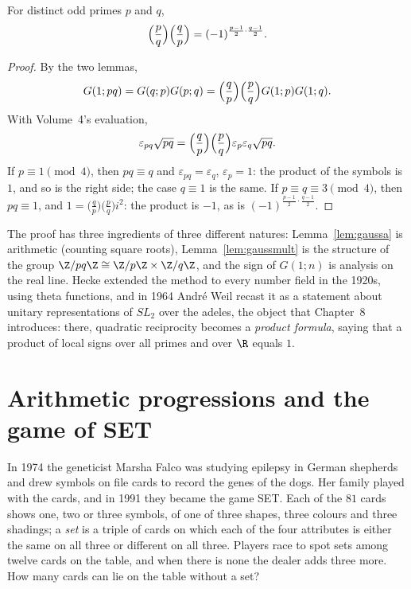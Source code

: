 \begin{theorem}\label{thm:qr}
For distinct odd primes $p$ and $q$,
\[\Bigl(\frac pq\Bigr)\Bigl(\frac qp\Bigr)=(-1)^{\frac{p-1}2\cdot\frac{q-1}2}.\]
\end{theorem}
\begin{proof}
By the two lemmas,
\[G(1;pq)=G(q;p)G(p;q)=\Bigl(\frac qp\Bigr)\Bigl(\frac pq\Bigr)G(1;p)G(1;q).\]
With Volume~4's evaluation,
\[\varepsilon_{pq}\sqrt{pq}=\Bigl(\frac qp\Bigr)\Bigl(\frac pq\Bigr)\varepsilon_p\varepsilon_q\sqrt{pq}.\]
If $p\equiv1\pmod4$, then $pq\equiv q$ and $\varepsilon_{pq}=\varepsilon_q$,
$\varepsilon_p=1$: the product of the symbols is $1$, and so is the right side; the case $q\equiv1$ is the same. If $p\equiv q\equiv3\pmod 4$, then
$pq\equiv1$, and $1=\bigl(\frac qp\bigr)\bigl(\frac pq\bigr)i^2$: the product is $-1$, as is $(-1)^{\frac{p-1}2\cdot\frac{q-1}2}$.
\end{proof}

\begin{beauty}
The proof has three ingredients of three different natures: Lemma~\ref{lem:gaussa} is arithmetic (counting square roots),
Lemma~\ref{lem:gaussmult} is the structure of the group $\Z/pq\Z\cong\Z/p\Z\times\Z/q\Z$, and the sign of $G(1;n)$ is analysis on the real
line. Hecke extended the method to every number field in the 1920s, using theta functions, and in 1964 Andr\'e Weil recast it as a
statement about unitary representations of $SL_2$ over the adeles, the object that Chapter~8 introduces: there, quadratic reciprocity
becomes a \emph{product formula}, saying that a product of local signs over all primes and over $\R$ equals $1$.
\end{beauty}

\section{Arithmetic progressions and the game of SET}

In 1974 the geneticist Marsha Falco was studying epilepsy in German shepherds and drew symbols on file cards to record the genes of
the dogs. Her family played with the cards, and in 1991 they became the game SET. Each of the $81$ cards shows one, two or three
symbols, of one of three shapes, three colours and three shadings; a \emph{set} is a triple of cards on which each of the four attributes
is either the same on all three or different on all three. Players race to spot sets among twelve cards on the table, and when there
is none the dealer adds three more. How many cards can lie on the table without a set?

